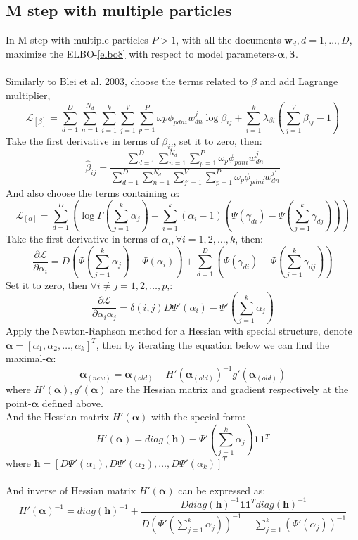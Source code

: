 \documentclass[a4paper]{article}
\newcommand{\bs}{\boldsymbol}
\newcommand{\Sum}{\displaystyle\sum}
\begin{document}
\subsection{M step with multiple particles}
In M step with multiple particles-$P>1$, with all the documents-$\bs{w}_d,d=1,\ldots,D$, maximize the  ELBO-\ref{elbo8} with respect to model parameters-$\bs{\alpha,}\bs{\beta}$.\\
\\
Similarly to Blei et al. 2003, choose the terms related to $\beta$ and add Lagrange multiplier,\\
\[
\mathcal{L}_{[\beta]}=\Sum_{d=1}^{D}\Sum_{n=1}^{N_d}\Sum_{i=1}^{k}\Sum_{j=1}^{V}\Sum_{p=1}^{P}\omega{p}\phi_{pdni}w_{dn}^j\log\beta_{ij}+\Sum_{i=1}^{k}\lambda_{\beta i}(\Sum_{j=1}^{V}\beta_{ij}-1)
\]
Take the first derivative in terms of $\beta_{ij}$, set it to zero, then:\\
\[
\hat{\beta}_{ij}=\frac{\sum_{d=1}^{D}\sum_{n=1}^{N_d}\sum_{p=1}^{P}\omega_{p}\phi_{pdni}w_{dn}^j}{\sum_{d=1}^{D}\sum_{n=1}^{N_d}\sum_{j'=1}^{V}\sum_{p=1}^{P}\omega_{p}\phi_{pdni}w_{dn}^{j'}}
\]
And also choose the terms containing $\alpha$:\\
\[
\mathcal{L}_{[\alpha]}=\Sum_{d=1}^{D}\left(\log\Gamma(\sum_{j=1}^{k}\alpha_j)+\Sum_{i=1}^{k}(\alpha_i-1)(\Psi(\gamma_{di})-\Psi(\sum_{j=1}^{k}\gamma_{dj}))\right)
\]
Take the first derivative in terms of $\alpha_{i},\forall i=1,2,\ldots,k$,  then:\\
\[
\frac{\partial \mathcal{L}}{\partial \alpha_{i} }=D(\Psi(\sum_{j=1}^{k}\alpha_j)-\Psi(\alpha_i))+\Sum_{d=1}^{D}(\Psi(\gamma_{di})-\Psi(\sum_{j=1}^{k}\gamma_{dj}))
\]
Set it to zero, then $\forall i\neq j=1,2,\ldots,p$,:\\
\[
\frac{\partial \mathcal{L}}{\partial \alpha_{i}\alpha_{j} }=\delta(i,j)D\Psi'(\alpha_i)-\Psi'(\sum_{j=1}^{k}\alpha_j)
\]
Apply the Newton-Raphson method for a Hessian with special structure, denote $\bs{\alpha}=[\alpha_{1},\alpha_{2},\ldots,\alpha_{k}]^T$, then by iterating the equation below we can find the maximal-$\bs{\alpha}$:\\
\[
\bs{\alpha}_{(new)}=\bs{\alpha}_{(old)}-H'(\bs{\alpha}_{(old)})^{-1}g'(\bs{\alpha}_{(old)})
\]
where $H'(\bs{\alpha}),g'(\bs{\alpha})$ are the Hessian matrix and gradient respectively at the point-$\bs{\alpha}$ defined above.\\
And the Hessian matrix $H'(\bs{\alpha})$ with the special form:\\
\[
H'(\bs{\alpha})=diag(\bs{h})-\Psi'(\sum_{j=1}^{k}\alpha_j)\bs{1}\bs{1}^T
\]
where $\bs{h}=[D\Psi'(\alpha_1),D\Psi'(\alpha_2),\ldots,D\Psi'(\alpha_k)]^T$\\
\\
And inverse of Hessian matrix $H'(\bs{\alpha})$ can be expressed as:\\
\[
H'(\bs{\alpha})^{-1}=diag(\bs{h})^{-1}+\frac{Ddiag(\bs{h})^{-1}\bs{1}\bs{1}^Tdiag(\bs{h})^{-1}}{D(\Psi'(\sum_{j=1}^{k}\alpha_j))^{-1}-\sum_{j=1}^{k}(\Psi'(\alpha_j))^{-1}}
\]
\end{document}
